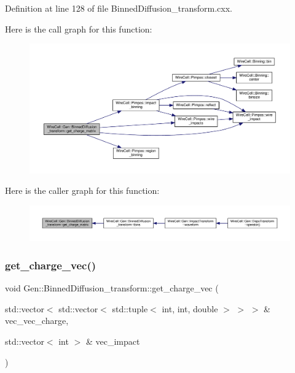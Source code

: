 Definition at line 128 of file Binned\+Diffusion\+\_\+transform.\+cxx.

Here is the call graph for this function\+:
\nopagebreak
\begin{figure}[H]
\begin{center}
\leavevmode
\includegraphics[width=350pt]{class_wire_cell_1_1_gen_1_1_binned_diffusion__transform_a7baeb40d106e11019f0cf96917a59d18_cgraph}
\end{center}
\end{figure}
Here is the caller graph for this function\+:
\nopagebreak
\begin{figure}[H]
\begin{center}
\leavevmode
\includegraphics[width=350pt]{class_wire_cell_1_1_gen_1_1_binned_diffusion__transform_a7baeb40d106e11019f0cf96917a59d18_icgraph}
\end{center}
\end{figure}
\mbox{\label{class_wire_cell_1_1_gen_1_1_binned_diffusion__transform_acb9922e051d067601b96fa03e80445bc}} 
\subsubsection{\texorpdfstring{get\+\_\+charge\+\_\+vec()}{get\_charge\_vec()}}
{\footnotesize\ttfamily void Gen\+::\+Binned\+Diffusion\+\_\+transform\+::get\+\_\+charge\+\_\+vec (\begin{DoxyParamCaption}\item[{std\+::vector$<$ std\+::vector$<$ std\+::tuple$<$ int, int, double $>$ $>$ $>$ \&}]{vec\+\_\+vec\+\_\+charge,  }\item[{std\+::vector$<$ int $>$ \&}]{vec\+\_\+impact }\end{DoxyParamCaption})}

